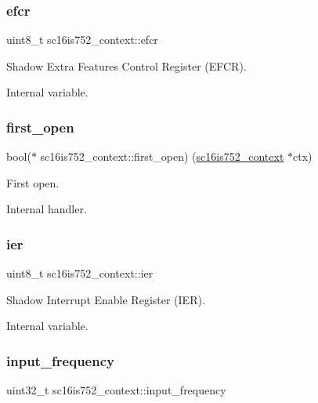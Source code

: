\subsubsection{\texorpdfstring{efcr}{efcr}}
{\footnotesize\ttfamily uint8\+\_\+t sc16is752\+\_\+context\+::efcr}



Shadow Extra Features Control Register (E\+F\+CR). 

Internal variable. \mbox{\label{structsc16is752__context_ae8e4d6e9f480559f9771e408aa1334ef}} 
\subsubsection{\texorpdfstring{first\_open}{first\_open}}
{\footnotesize\ttfamily bool($\ast$ sc16is752\+\_\+context\+::first\+\_\+open) (\mbox{\hyperlink{structsc16is752__context}{sc16is752\+\_\+context}} $\ast$ctx)}



First open. 

Internal handler. \mbox{\label{structsc16is752__context_a4056af13f5dcf980319b4db533de895c}} 
\subsubsection{\texorpdfstring{ier}{ier}}
{\footnotesize\ttfamily uint8\+\_\+t sc16is752\+\_\+context\+::ier}



Shadow Interrupt Enable Register (I\+ER). 

Internal variable. \mbox{\label{structsc16is752__context_a4576615a32e41a3a28c450ed8b74de69}} 
\subsubsection{\texorpdfstring{input\_frequency}{input\_frequency}}
{\footnotesize\ttfamily uint32\+\_\+t sc16is752\+\_\+context\+::input\+\_\+frequency}




